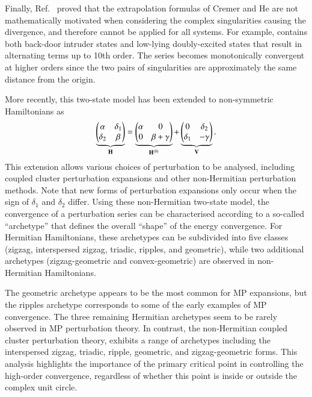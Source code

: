 \documentclass[aps,prb,reprint,noshowkeys,linenumbers,superscriptaddress]{revtex4-1}
\newcommand{\bH}{\mathbf{H}}
\newcommand{\bV}{\mathbf{V}}
\begin{document}
Finally, Ref.~ proved that the extrapolation formulas of Cremer and He \cite{Cremer_1996}
are not mathematically motivated when considering the complex singularities causing the divergence, and therefore
cannot be applied for all systems.
For example,  contains both back-door intruder states and low-lying doubly-excited states that
result in alternating terms up to 10th order. 
The series becomes monotonically convergent at higher orders since
the two pairs of singularities are approximately the same distance from the origin.

More recently, this two-state model has been extended to non-symmetric Hamiltonians as\cite{Olsen_2019}
\begin{equation}
	\underbrace{\mqty(\alpha & \delta_1 \\ \delta_2 & \beta)}_{\bH} = \underbrace{\mqty(\alpha & 0 \\ 0 & \beta + \gamma )}_{\bH^{(0)}} + \underbrace{\mqty( 0 & \delta_2 \\ \delta_1 & - \gamma)}_{\bV}.
\end{equation}
This extension allows various choices of perturbation to be analysed, including coupled cluster 
perturbation expansions \cite{Pawlowski_2019a,Pawlowski_2019b,Pawlowski_2019c,Pawlowski_2019d,Pawlowski_2019e} 
and other non-Hermitian perturbation methods.
Note that new forms of perturbation expansions only occur when the sign of $\delta_1$ and $\delta_2$ differ.
Using these non-Hermitian two-state model, the convergence of a perturbation series can be characterised 
according to a so-called ``archetype'' that defines the overall ``shape'' of the energy convergence.\cite{Olsen_2019} 
For Hermitian Hamiltonians, these archetypes can be subdivided into five classes 
(zigzag, interspersed zigzag, triadic, ripples, and geometric), 
while two additional archetypes (zigzag-geometric and convex-geometric) are observed in non-Hermitian Hamiltonians.

The geometric archetype appears to be the most common for MP expansions,\cite{Olsen_2019} but the 
ripples archetype corresponds to some of the early examples of MP convergence. \cite{Handy_1985,Lepetit_1988,Leininger_2000}
The three remaining Hermitian archetypes seem to be rarely observed in MP perturbation theory.
In contrast, the non-Hermitian coupled cluster perturbation theory,%
\cite{Pawlowski_2019a,Pawlowski_2019b,Pawlowski_2019c,Pawlowski_2019d,Pawlowski_2019e} exhibits a range of archetypes
including the interspersed zigzag, triadic, ripple, geometric, and zigzag-geometric forms.
This analysis highlights the importance of the primary critical point in controlling the high-order convergence, 
regardless of whether this point is inside or outside the complex unit circle. \cite{Handy_1985,Olsen_2000}
\end{document}

